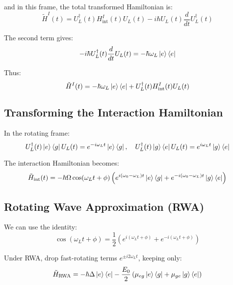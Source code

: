 and in this frame, the total transformed Hamiltonian is:
\begin{equation}
	\tilde{H}^I(t) = U_L^\dagger(t) H_{\text{int}}^I(t) U_L(t) - i\hbar U_L(t) \frac{d}{dt} U_L^\dagger(t)
	\label{eq:TransformedHamiltonian}
\end{equation}

The second term gives:
\begin{equation}
	-i\hbar U_L^\dagger(t) \frac{d}{dt} U_L(t) = - \hbar \omega_L \ket{e}\bra{e}
	\label{eq:SecondTermHamiltonian}
\end{equation}

Thus:
\begin{equation}
	\tilde{H}^I(t) = - \hbar \omega_L \ket{e}\bra{e} + U_L^\dagger(t) H_{\text{int}}^I(t) U_L(t)
	\label{eq:FinalTransformedHamiltonian}
\end{equation}


\subsection*{Transforming the Interaction Hamiltonian}

In the rotating frame:
\begin{equation}
	U_L^\dagger(t) \ket{e}\bra{g} U_L(t) = e^{-i\omega_L t} \ket{e}\bra{g}, \quad
	U_L^\dagger(t) \ket{g}\bra{e} U_L(t) = e^{i\omega_L t} \ket{g}\bra{e}
	\label{eq:RotatingFrameOperators}
\end{equation}

The interaction Hamiltonian becomes:
\begin{equation}
	\tilde{H}_{\text{int}}(t) = -\hbar\Omega \cos(\omega_L t + \phi)\left(e^{i(\omega_0 - \omega_L)t} \ket{e}\bra{g} + e^{-i(\omega_0 - \omega_L)t} \ket{g}\bra{e} \right)	
		\label{eq:TransformedInteractionHamiltonian}
\end{equation}

\subsection*{Rotating Wave Approximation (RWA)}
We can use the identity:
\begin{equation}
	\cos(\omega_L t + \phi) = \frac{1}{2}\left(e^{i(\omega_L t + \phi)} + e^{-i(\omega_L t + \phi)} \right)
\end{equation}
	
Under RWA, drop fast-rotating terms \(e^{\pm i2\omega_L t}\), keeping only:
\begin{equation}
	\tilde{H}_{\text{RWA}} = -\hbar \Delta \ket{e}\bra{e} - \frac{E_0}{2} \left(
	\mu_{eg} \ket{e}\bra{g} + \mu_{ge} \ket{g}\bra{e}
	\right)
	\label{eq:RWAHamiltonianFinal}
\end{equation}

